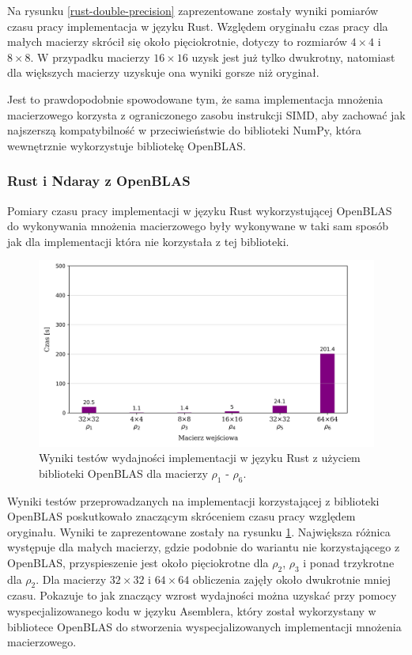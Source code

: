 \documentclass[11pt, a4paper]{article}
\begin{document}
\begin{sloppypar}
    Na rysunku \ref{rust-double-precision} zaprezentowane zostały wyniki pomiarów czasu
    pracy implementacja w języku Rust. Względem oryginału czas pracy dla małych macierzy
    skrócił się około pięciokrotnie, dotyczy to rozmiarów $4\times4$ i $8\times8$. W przypadku
    macierzy $16\times16$ uzysk jest już tylko dwukrotny, natomiast dla większych
    macierzy uzyskuje ona wyniki gorsze niż oryginał.

    Jest to prawdopodobnie spowodowane tym, że sama implementacja mnożenia macierzowego korzysta
    z ograniczonego zasobu instrukcji SIMD, aby zachować jak najszerszą kompatybilność w
    przeciwieństwie do biblioteki NumPy, która wewnętrznie wykorzystuje bibliotekę OpenBLAS\cite{NumPy_Doc}.

    \FloatBarrier

    \subsubsection{ Rust i Ndaray z OpenBLAS }
    Pomiary czasu pracy implementacji w języku Rust wykorzystującej OpenBLAS do wykonywania
    mnożenia macierzowego były wykonywane w taki sam sposób jak dla implementacji która nie
    korzystała z tej biblioteki.

    \begin{figure}[ht]
      \centering
      \includegraphics[width=1.0\textwidth]{"resources/rust_blas_perf_tests.png"}
      \caption{Wyniki testów wydajności implementacji w języku Rust z użyciem biblioteki OpenBLAS dla macierzy $\rho
      _{1}$ - $\rho_{6}$.}
      \label{rust-openblas-double-precision}
    \end{figure}

    Wyniki testów przeprowadzanych na implementacji korzystającej z biblioteki OpenBLAS
    poskutkowało znaczącym skróceniem czasu pracy względem oryginału. Wyniki te zaprezentowane
    zostały na rysunku \ref{rust-openblas-double-precision}. Największa różnica
    występuje dla małych macierzy, gdzie podobnie do wariantu nie korzystającego z OpenBLAS,
    przyspieszenie jest około pięciokrotne dla $\rho_{2}$, $\rho_{3}$ i ponad trzykrotne
    dla $\rho_{2}$. Dla macierzy $32\times32$ i $64\times64$ obliczenia zajęły około
    dwukrotnie mniej czasu. Pokazuje to jak znaczący wzrost wydajności można uzyskać przy
    pomocy wyspecjalizowanego kodu w języku Asemblera, który został wykorzystany w
    bibliotece OpenBLAS do stworzenia wyspecjalizowanych implementacji mnożenia
    macierzowego.


\end{sloppypar}
\end{document}
